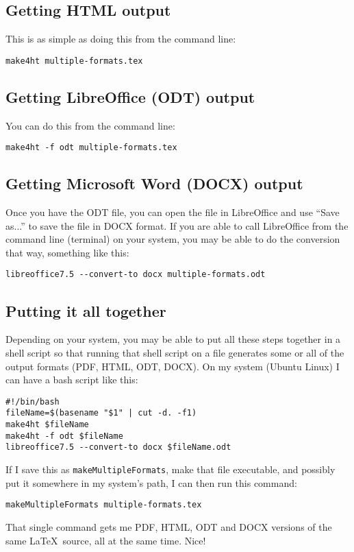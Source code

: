 \documentclass[a4paper,12pt]{article}
\begin{document}
\subsection{Getting HTML output}

This is as simple as doing this from the command line:
\begin{verbatim}
make4ht multiple-formats.tex
\end{verbatim}

\subsection{Getting LibreOffice (ODT) output}

You can do this from the command line:
\begin{verbatim}
make4ht -f odt multiple-formats.tex
\end{verbatim}

\subsection{Getting Microsoft Word (DOCX) output}
\label{msword}
Once you have the ODT file, you can open the file in LibreOffice and
use ``Save as...'' to save the file in DOCX format.  If you are able
to call LibreOffice from the command line (terminal) on your system,
you may be able to do the conversion that way, something like this:
\begin{verbatim}
libreoffice7.5 --convert-to docx multiple-formats.odt
\end{verbatim}

\subsection{Putting it all together}

Depending on your system, you may be able to put all these steps
together in a shell script so that running that shell script on a
file generates some or all of the output formats (PDF, HTML, ODT,
DOCX). On my system (Ubuntu Linux) I can have a bash script like this:
\begin{verbatim}
#!/bin/bash
fileName=$(basename "$1" | cut -d. -f1)
make4ht $fileName
make4ht -f odt $fileName
libreoffice7.5 --convert-to docx $fileName.odt
\end{verbatim}
If I save this as \verb!makeMultipleFormats!, make that file
executable, and possibly put it somewhere in my system's path, I can
then run this command:
\begin{verbatim}
makeMultipleFormats multiple-formats.tex
\end{verbatim}
That single command gets me PDF, HTML, ODT and DOCX versions of the
same \LaTeX\ source, all at the same time. Nice!
\end{document}
